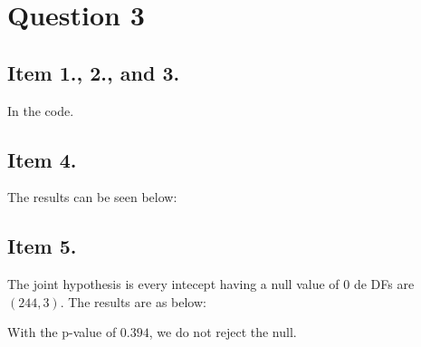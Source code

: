 \documentclass[12pt]{article}
\begin{document}





\section*{Question 3}

\subsection*{Item 1., 2., and 3.}
In the code.


\subsection*{Item 4.}
The results can be seen below:




\subsection*{Item 5.}
The joint hypothesis is every intecept having a null value of $0$ de DFs are $(244, 3)$. The results are as below:



With the p-value of $0.394$, we do not reject the null.
\end{document}
